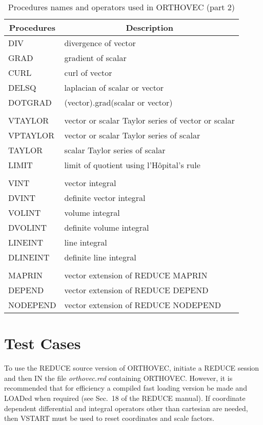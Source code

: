 \begin{table}
\begin{center}
\begin{tabular}{|l l|} \hline
\multicolumn{1}{|c}{Procedures} & \multicolumn{1}{c|}{Description} \\ \hline
DIV & divergence of vector \\
GRAD & gradient of scalar \\
CURL & curl of vector \\
DELSQ & laplacian of scalar or vector \\
DOTGRAD & (vector).grad(scalar or vector) \\ &  \\
VTAYLOR & vector or scalar Taylor series of vector or scalar \\
VPTAYLOR & vector or scalar Taylor series of scalar \\
TAYLOR & scalar Taylor series of scalar \\
LIMIT & limit of quotient using l'H\^opital's rule \\ &  \\
VINT & vector integral \\
DVINT & definite vector integral \\
VOLINT & volume integral \\
DVOLINT & definite volume integral \\
LINEINT & line integral \\
DLINEINT & definite line integral \\  & \\
MAPRIN & vector extension of REDUCE MAPRIN \\
DEPEND & vector extension of REDUCE DEPEND \\
NODEPEND & vector extension of REDUCE NODEPEND \\ \hline
\end{tabular}
\end{center}
\caption{Procedures names and operators used in ORTHOVEC (part 2)}
\end{table}


\section{Test Cases}

To use the REDUCE source version of ORTHOVEC, initiate a REDUCE
session and then IN the file {\em orthovec.red} containing ORTHOVEC.
However, it is recommended that for efficiency a compiled fast loading
version be made and LOADed when required (see Sec.~18 of the REDUCE
manual).  If coordinate dependent differential and integral operators
other than cartesian are needed, then VSTART must be used to reset
coordinates and scale factors.

